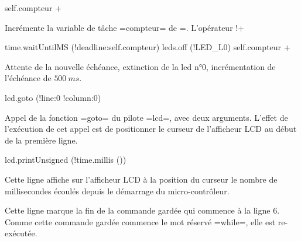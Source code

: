 \begin{PLM}[8]
    self.compteur +%
\end{PLM}

Incrémente la variable de tâche \plm=compteur= de =. L'opérateur \plm!+%


\begin{PLM}[9]
    time.waitUntilMS (!deadline:self.compteur)
    leds.off (!LED_L0)
    self.compteur +%
\end{PLM}

Attente de la nouvelle échéance, extinction de la led n°0, incrémentation de l'échéance de $500~ms$.


\begin{PLM}[12]
    lcd.goto (!line:0 !column:0)
\end{PLM}

Appel de la fonction \plm=goto= du pilote \plm=lcd=, avec deux arguments. L'effet de l'exécution de cet appel est de positionner le curseur de l'afficheur LCD au début de la première ligne.




\begin{PLM}[13]
    lcd.printUnsigned (!time.millis ())
\end{PLM}

Cette ligne affiche sur l'afficheur LCD à la position du curseur le nombre de millisecondes écoulés depuis le démarrage du micro-contrôleur.






\begin{PLM}[14]
  }
\end{PLM}

Cette ligne marque la fin de la commande gardée qui commence à la ligne $6$. Comme cette commande gardée commence le mot réservé \plm=while=, elle est re-exécutée.


